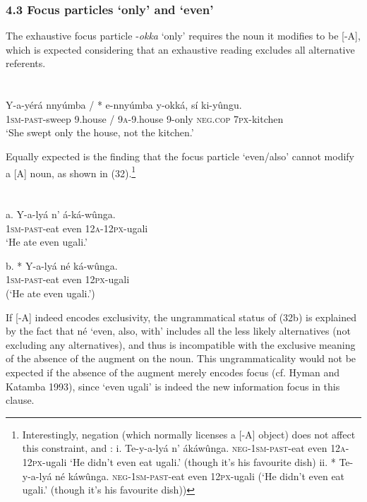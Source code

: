 \documentclass[output=paper]{langsci/langscibook}
\begin{document}
\subsection{ 4.3 Focus particles ‘only’ and ‘even’}

The exhaustive focus particle -\textit{okka} ‘only’ requires the noun it modifies to be [-A], which is expected considering that an exhaustive reading excludes all alternative referents.

\chapter{}
\gll   Y-a-yérá    nnyúmba /  * e-nnyúmba  y-okká,  sí    ki-yûngu.\\
       \textsc{1sm}{}-\textsc{past}{}-sweep  9.house /  \textsc{9a}{}-9.house  9-only\textsc{  neg}.\textsc{cop}  \textsc{7px}{}-kitchen\\
\glt ‘She swept only the house, not the kitchen.’
\z

Equally expected is the finding that the focus particle ‘even/also’ cannot modify a [A] noun, as shown in (32).\footnote{{ }Interestingly, negation (which normally licenses a [-A] object) does not affect this constraint, and :
i.  Te-y-a-lyá    n’  ákáwûnga.
  \textsc{neg}{}-\textsc{1sm}{}-\textsc{past}{}-eat  even  \textsc{12a}{}-\textsc{12px}{}-ugali
  ‘He didn’t even eat ugali.’ (though it’s his favourite dish)
ii.  * Te-y-a-lyá    né  káwûnga.
  \textsc{neg}{}-\textsc{1sm}{}-\textsc{past}{}-eat  even  \textsc{12px}{}-ugali
  (‘He didn’t even eat ugali.’ (though it’s his favourite dish))}

\chapter[  ]{  }
\gll   a.  Y-a-lyá    n’  á-ká-wûnga.\\
         \textsc{1sm}{}-\textsc{past}{}-eat  even  \textsc{12a}{}-\textsc{12px}{}-ugali\\
\glt     ‘He ate even ugali.’
\z

\gll   b.  * Y-a-lyá    né  ká-wûnga.\\
         \textsc{1sm}{}-\textsc{past}{}-eat  even  \textsc{12px}{}-ugali\\
\glt     (‘He ate even ugali.’)
\z

If [-A] indeed encodes exclusivity, the ungrammatical status of (32b) is explained by the fact that né ‘even, also, with’ includes all the less likely alternatives (not excluding any alternatives), and thus is incompatible with the exclusive meaning of the absence of the augment on the noun. This ungrammaticality would not be expected if the absence of the augment merely encodes focus (cf. Hyman and Katamba 1993), since ‘even ugali’ is indeed the new information focus in this clause.
\end{document}
